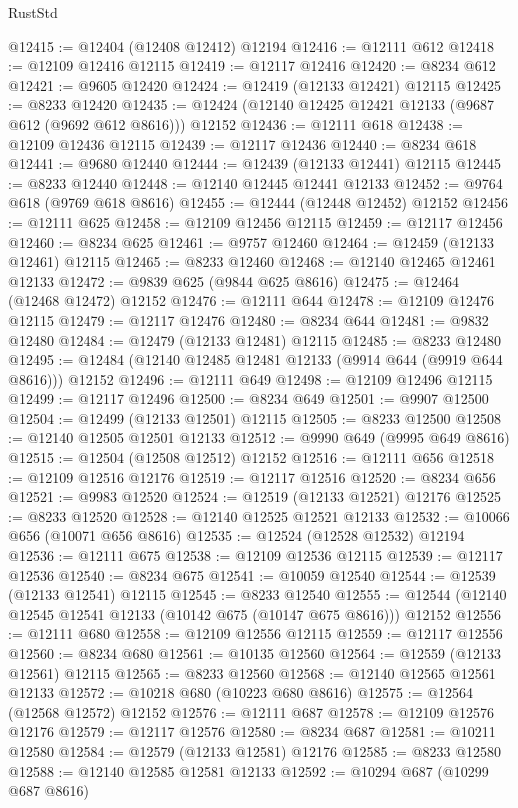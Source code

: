 \begin{lexlean}{RustStd}
\begin{coremodule}
@12415 := @12404 (@12408 @12412) @12194
@12416 := @12111 @612
@12418 := @12109 @12416 @12115
@12419 := @12117 @12416
@12420 := @8234 @612
@12421 := @9605 @12420
@12424 := @12419 (@12133 @12421) @12115
@12425 := @8233 @12420
@12435 := @12424 (@12140 @12425 @12421 @12133 (@9687 @612 (@9692 @612 @8616))) @12152
@12436 := @12111 @618
@12438 := @12109 @12436 @12115
@12439 := @12117 @12436
@12440 := @8234 @618
@12441 := @9680 @12440
@12444 := @12439 (@12133 @12441) @12115
@12445 := @8233 @12440
@12448 := @12140 @12445 @12441 @12133
@12452 := @9764 @618 (@9769 @618 @8616)
@12455 := @12444 (@12448 @12452) @12152
@12456 := @12111 @625
@12458 := @12109 @12456 @12115
@12459 := @12117 @12456
@12460 := @8234 @625
@12461 := @9757 @12460
@12464 := @12459 (@12133 @12461) @12115
@12465 := @8233 @12460
@12468 := @12140 @12465 @12461 @12133
@12472 := @9839 @625 (@9844 @625 @8616)
@12475 := @12464 (@12468 @12472) @12152
@12476 := @12111 @644
@12478 := @12109 @12476 @12115
@12479 := @12117 @12476
@12480 := @8234 @644
@12481 := @9832 @12480
@12484 := @12479 (@12133 @12481) @12115
@12485 := @8233 @12480
@12495 := @12484 (@12140 @12485 @12481 @12133 (@9914 @644 (@9919 @644 @8616))) @12152
@12496 := @12111 @649
@12498 := @12109 @12496 @12115
@12499 := @12117 @12496
@12500 := @8234 @649
@12501 := @9907 @12500
@12504 := @12499 (@12133 @12501) @12115
@12505 := @8233 @12500
@12508 := @12140 @12505 @12501 @12133
@12512 := @9990 @649 (@9995 @649 @8616)
@12515 := @12504 (@12508 @12512) @12152
@12516 := @12111 @656
@12518 := @12109 @12516 @12176
@12519 := @12117 @12516
@12520 := @8234 @656
@12521 := @9983 @12520
@12524 := @12519 (@12133 @12521) @12176
@12525 := @8233 @12520
@12528 := @12140 @12525 @12521 @12133
@12532 := @10066 @656 (@10071 @656 @8616)
@12535 := @12524 (@12528 @12532) @12194
@12536 := @12111 @675
@12538 := @12109 @12536 @12115
@12539 := @12117 @12536
@12540 := @8234 @675
@12541 := @10059 @12540
@12544 := @12539 (@12133 @12541) @12115
@12545 := @8233 @12540
@12555 := @12544 (@12140 @12545 @12541 @12133 (@10142 @675 (@10147 @675 @8616))) @12152
@12556 := @12111 @680
@12558 := @12109 @12556 @12115
@12559 := @12117 @12556
@12560 := @8234 @680
@12561 := @10135 @12560
@12564 := @12559 (@12133 @12561) @12115
@12565 := @8233 @12560
@12568 := @12140 @12565 @12561 @12133
@12572 := @10218 @680 (@10223 @680 @8616)
@12575 := @12564 (@12568 @12572) @12152
@12576 := @12111 @687
@12578 := @12109 @12576 @12176
@12579 := @12117 @12576
@12580 := @8234 @687
@12581 := @10211 @12580
@12584 := @12579 (@12133 @12581) @12176
@12585 := @8233 @12580
@12588 := @12140 @12585 @12581 @12133
@12592 := @10294 @687 (@10299 @687 @8616)

\end{coremodule}
\end{lexlean}
